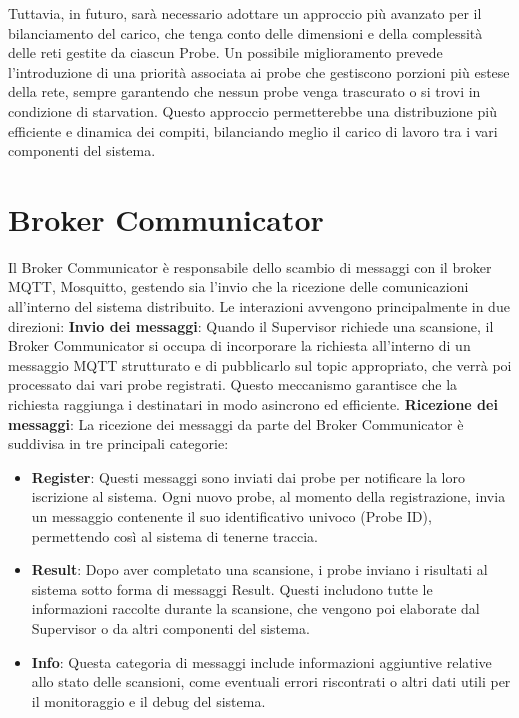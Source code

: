 \documentclass[target=bach,aauheader=,style=]{thud}
\begin{document}
Tuttavia, in futuro, sarà necessario adottare un approccio più avanzato per il bilanciamento del carico, che tenga conto delle dimensioni e della complessità delle reti gestite da ciascun Probe. Un possibile miglioramento prevede l'introduzione di una priorità associata ai probe che gestiscono porzioni più estese della rete, sempre garantendo che nessun probe venga trascurato o si trovi in condizione di starvation. Questo approccio permetterebbe una distribuzione più efficiente e dinamica dei compiti, bilanciando meglio il carico di lavoro tra i vari componenti del sistema.

\section{Broker Communicator}
Il Broker Communicator è responsabile dello scambio di messaggi con il broker MQTT, Mosquitto, gestendo sia l'invio che la ricezione delle comunicazioni all'interno del sistema distribuito. Le interazioni avvengono principalmente in due direzioni:
\newline
\textbf{Invio dei messaggi}: Quando il Supervisor richiede una scansione, il Broker Communicator si occupa di incorporare la richiesta all'interno di un messaggio MQTT strutturato e di pubblicarlo sul topic appropriato, che verrà poi processato dai vari probe registrati. Questo meccanismo garantisce che la richiesta raggiunga i destinatari in modo asincrono ed efficiente.
\newline
\textbf{Ricezione dei messaggi}: La ricezione dei messaggi da parte del Broker Communicator è suddivisa in tre principali categorie:
\begin{itemize}

  \item \textbf{Register}: Questi messaggi sono inviati dai probe per notificare la loro iscrizione al sistema. Ogni nuovo probe, al momento della registrazione, invia un messaggio contenente il suo identificativo univoco (Probe ID), permettendo così al sistema di tenerne traccia.

  \item \textbf{Result}: Dopo aver completato una scansione, i probe inviano i risultati al sistema sotto forma di messaggi Result. Questi includono tutte le informazioni raccolte durante la scansione, che vengono poi elaborate dal Supervisor o da altri componenti del sistema.

  \item \textbf{Info}: Questa categoria di messaggi include informazioni aggiuntive relative allo stato delle scansioni, come eventuali errori riscontrati o altri dati utili per il monitoraggio e il debug del sistema.
\end{itemize}
\end{document}
